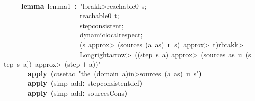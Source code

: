 \documentclass{article}
\newcommand{\syntaxKEYWORDA}[1]{\textcolor[rgb]{0.0,0.4,0.6}{\textbf{#1}}}
\newcommand{\syntaxLITERALA}[1]{\textcolor[rgb]{1.0,0.0,0.8}{#1}}
\newcommand{\syntaxOPERATOR}[1]{\textcolor[rgb]{0.0,0.0,0.0}{\textbf{#1}}}
\newcommand{\syntaxKEYWORDA}[1]{\textcolor[rgb]{0.0,0.4,0.6}{\textbf{#1}}}
\newcommand{\syntaxLITERALA}[1]{\textcolor[rgb]{1.0,0.0,0.8}{#1}}
\newcommand{\syntaxOPERATOR}[1]{\textcolor[rgb]{0.0,0.0,0.0}{\textbf{#1}}}
\newcommand{\syntaxKEYWORDA}[1]{\textcolor[rgb]{0.0,0.4,0.6}{\textbf{#1}}}
\newcommand{\syntaxLITERALA}[1]{\textcolor[rgb]{1.0,0.0,0.8}{#1}}
\newcommand{\syntaxOPERATOR}[1]{\textcolor[rgb]{0.0,0.0,0.0}{\textbf{#1}}}
\newcommand{\syntaxKEYWORDA}[1]{\textcolor[rgb]{0.0,0.4,0.6}{#1}}
\newcommand{\syntaxLITERALA}[1]{\textcolor[rgb]{1.0,0.0,0.8}{\textbf{#1}}}
\newcommand{\syntaxOPERATOR}[1]{\textcolor[rgb]{0.0,0.0,0.0}{#1}}
\newcommand{\syntaxKEYWORDA}[1]{\textcolor[rgb]{0.0,0.4,0.6}{\textbf{#1}}}
\newcommand{\syntaxLITERALA}[1]{\textcolor[rgb]{1.0,0.0,0.8}{#1}}
\newcommand{\syntaxOPERATOR}[1]{\textcolor[rgb]{0.0,0.0,0.0}{\textbf{#1}}}
\newcommand{\syntaxKEYWORDA}[1]{\textcolor[rgb]{0.0,0.4,0.6}{\textbf{#1}}}
\newcommand{\syntaxLITERALA}[1]{\textcolor[rgb]{1.0,0.0,0.8}{#1}}
\newcommand{\syntaxOPERATOR}[1]{\textcolor[rgb]{0.0,0.0,0.0}{\textbf{#1}}}
\begin{document}
\hspace*{\fill}\\
{\ }{\ }{\ }{\ }{\ }\syntaxKEYWORDA{lemma}{\ }lemma\usebox{\underscorebox}1{\ }\syntaxOPERATOR{:}{\ }\syntaxLITERALA{"\<lbrakk>reachable0{\ }s;}\hspace*{\fill}\\
\syntaxLITERALA{{\ }{\ }{\ }{\ }{\ }{\ }{\ }{\ }{\ }{\ }{\ }{\ }{\ }{\ }{\ }{\ }{\ }{\ }{\ }{\ }{\ }{\ }reachable0{\ }t;}\hspace*{\fill}\\
\syntaxLITERALA{{\ }{\ }{\ }{\ }{\ }{\ }{\ }{\ }{\ }{\ }{\ }{\ }{\ }{\ }{\ }{\ }{\ }{\ }{\ }{\ }{\ }{\ }step\usebox{\underscorebox}consistent;}\hspace*{\fill}\\
\syntaxLITERALA{{\ }{\ }{\ }{\ }{\ }{\ }{\ }{\ }{\ }{\ }{\ }{\ }{\ }{\ }{\ }{\ }{\ }{\ }{\ }{\ }{\ }{\ }dynamic\usebox{\underscorebox}local\usebox{\underscorebox}respect;}\hspace*{\fill}\\
\syntaxLITERALA{{\ }{\ }{\ }{\ }{\ }{\ }{\ }{\ }{\ }{\ }{\ }{\ }{\ }{\ }{\ }{\ }{\ }{\ }{\ }{\ }{\ }{\ }(s{\ }\<approx>{\ }(sources{\ }(a{\ }\usebox{\hashbox}{\ }as){\ }u{\ }s){\ }\<approx>{\ }t)\<rbrakk>}\hspace*{\fill}\\
\syntaxLITERALA{{\ }{\ }{\ }{\ }{\ }{\ }{\ }{\ }{\ }{\ }{\ }{\ }{\ }{\ }{\ }{\ }{\ }{\ }{\ }{\ }{\ }{\ }\<Longrightarrow>{\ }((step{\ }s{\ }a){\ }\<approx>{\ }(sources{\ }as{\ }u{\ }(step{\ }s{\ }a)){\ }\<approx>{\ }(step{\ }t{\ }a))"}\hspace*{\fill}\\
{\ }{\ }{\ }{\ }{\ }{\ }{\ }\syntaxKEYWORDA{apply}{\ }\syntaxOPERATOR{(}case\usebox{\underscorebox}tac{\ }\syntaxLITERALA{"the{\ }(domain{\ }a)\<in>sources{\ }(a{\ }\usebox{\hashbox}{\ }as){\ }u{\ }s"}\syntaxOPERATOR{)}\hspace*{\fill}\\
{\ }{\ }{\ }{\ }{\ }{\ }{\ }\syntaxKEYWORDA{apply}{\ }\syntaxOPERATOR{(}simp{\ }add\syntaxOPERATOR{:}{\ }step\usebox{\underscorebox}consistent\usebox{\underscorebox}def\syntaxOPERATOR{)}\hspace*{\fill}\\
{\ }{\ }{\ }{\ }{\ }{\ }{\ }\syntaxKEYWORDA{apply}{\ }\syntaxOPERATOR{(}simp{\ }add\syntaxOPERATOR{:}{\ }sources\usebox{\underscorebox}Cons\syntaxOPERATOR{)}{\ }{\ }{\ }{\ }{\ }{\ }{\ }{\ }{\ }{\ }{\ }{\ }{\ }{\ }{\ }{\ }{\ }{\ }{\ }{\ }{\ }{\ }{\ }{\ }{\ }{\ }{\ }{\ }{\ }{\ }{\ }{\ }{\ }{\ }{\ }{\ }{\ }{\ }{\ }{\ }{\ }{\ }{\ }{\ }{\ }{\ }{\ }{\ }{\ }{\ }{\ }{\ }{\ }{\ }{\ }{\ }\hspace*{\fill}\\
\end{document}
